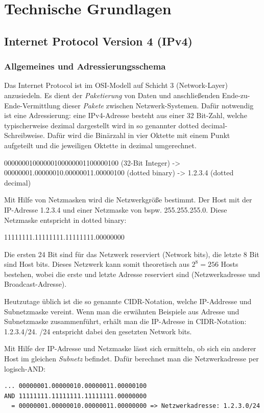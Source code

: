 \chapter{Technische Grundlagen} \label{Technische_Grundlagen}

\section{Internet Protocol Version 4 (IPv4)} \label{ipv4}
\subsection{Allgemeines und Adressierungsschema}
Das Internet Protocol ist im OSI-Modell auf Schicht 3 (Network-Layer) anzusiedeln. Es dient der \textit{Paketierung} von Daten und anschließenden Ende-zu-Ende-Vermittlung dieser \textit{Pakete} zwischen Netzwerk-Systemen. Dafür notwendig ist eine Adressierung: eine IPv4-Adresse besteht aus einer 32 Bit-Zahl, welche typischerweise dezimal dargestellt wird in so genannter \glqq dotted decimal\grqq{}-Schreibweise. Dafür wird die Binärzahl in vier Oktette mit einem Punkt aufgeteilt und die jeweiligen Oktette in dezimal umgerechnet.

00000001000000100000001100000100 (32-Bit Integer) ->  00000001.00000010.00000011.00000100 (dotted binary) -> 1.2.3.4 (dotted decimal)

Mit Hilfe von Netzmasken wird die Netzwerkgröße bestimmt. Der Host mit der IP-Adresse 1.2.3.4 und einer Netzmaske von bspw. 255.255.255.0. Diese Netzmaske entspricht in dotted binary:

11111111.11111111.11111111.00000000

Die ersten 24 Bit sind für das Netzwerk reserviert (Network bits), die letzte 8 Bit sind Host bits. Dieses Netzwerk kann somit theoretisch aus $2^8 = 256$ Hosts bestehen, wobei die erste und letzte Adresse reserviert sind (Netzwerkadresse und Broadcast-Adresse).

Heutzutage üblich ist die so genannte CIDR-Notation, welche IP-Addresse und Subnetzmaske vereint. Wenn man die erwähnten Beispiele aus Adresse und Subnetzmaske zusammenführt, erhält man die IP-Adresse in CIDR-Notation: 1.2.3.4/24. /24 entspricht dabei den gesetzten Network bits.

Mit Hilfe der IP-Adresse und Netzmaske lässt sich ermitteln, ob sich ein anderer Host im gleichen \textit{Subnetz} befindet. Dafür berechnet man die Netzwerkadresse per logisch-AND:

\begin{lstlisting}[label=local-ip-address-AND-subnet,caption=Blub]
... 00000001.00000010.00000011.00000100
AND 11111111.11111111.11111111.00000000
  = 00000001.00000010.00000011.00000000 => Netzwerkadresse: 1.2.3.0/24
\end{lstlisting}
    
